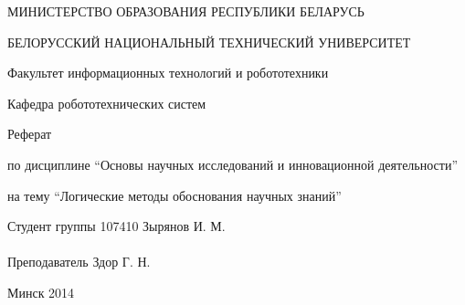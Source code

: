 \begin{titlepage} %

\thispagestyle{empty} %

\begin{center}
МИНИСТЕРСТВО ОБРАЗОВАНИЯ РЕСПУБЛИКИ БЕЛАРУСЬ

БЕЛОРУССКИЙ НАЦИОНАЛЬНЫЙ ТЕХНИЧЕСКИЙ УНИВЕРСИТЕТ

Факультет информационных технологий и робототехники

Кафедра робототехнических систем
\end{center}

\vfill

\begin{center}
    \large{Реферат}

    \normalsize{по дисциплине ``Основы научных исследований и инновационной деятельности''}

    \normalsize{на тему ``Логические методы обоснования научных знаний''}
\end{center}

\vfill

\noindent
Студент группы 107410 \hfill Зырянов И. М.
\\
\\
\noindent
Преподаватель \hfill Здор Г. Н.

\vfill

\centerline{Минск 2014}

\clearpage %

\end{titlepage}

\setcounter{page}{2}
